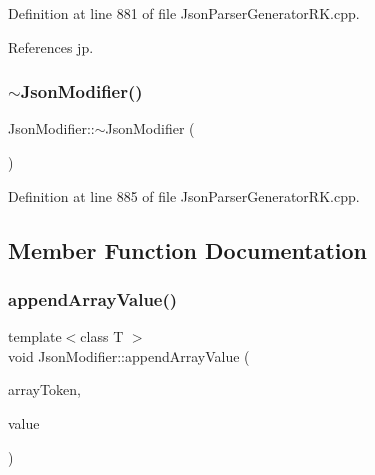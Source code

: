 Definition at line 881 of file Json\+Parser\+Generator\+R\+K.\+cpp.



References jp.

\mbox{\label{class_json_modifier_a68e9b6a5b88ad4316fd1cb443cc0b11e}} 
\subsubsection{\texorpdfstring{$\sim$\+Json\+Modifier()}{~JsonModifier()}}
{\footnotesize\ttfamily Json\+Modifier\+::$\sim$\+Json\+Modifier (\begin{DoxyParamCaption}{ }\end{DoxyParamCaption})\hspace{0.3cm}{\ttfamily [virtual]}}



Definition at line 885 of file Json\+Parser\+Generator\+R\+K.\+cpp.



\subsection{Member Function Documentation}
\mbox{\label{class_json_modifier_ac492f5945ef4e4bc003fea5af5b9c504}} 
\subsubsection{\texorpdfstring{append\+Array\+Value()}{appendArrayValue()}}
{\footnotesize\ttfamily template$<$class T $>$ \\
void Json\+Modifier\+::append\+Array\+Value (\begin{DoxyParamCaption}\item[{const \hyperlink{struct_json_parser_generator_r_k_1_1jsmntok__t}{Json\+Parser\+Generator\+R\+K\+::jsmntok\+\_\+t} $\ast$}]{array\+Token,  }\item[{T}]{value }\end{DoxyParamCaption})\hspace{0.3cm}{\ttfamily [inline]}}



